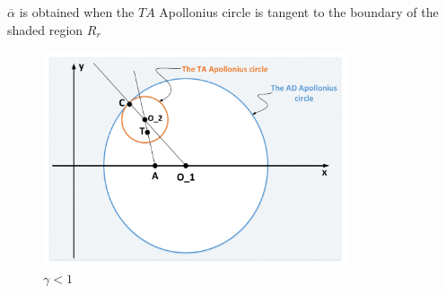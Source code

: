 \documentclass{beamer}
\begin{document}
\begin{frame}
$\overline{\alpha}$ is obtained when the $TA$ Apollonius circle is tangent to the boundary of the shaded region $R_r$

\centering
\begin{figure}
\includegraphics[width=0.8\textwidth]{fig/drawing4_2a.pdf}
\caption {$\gamma<1$}
\label{4_g<1}
\end{figure}
\end{frame}
\end{document}
